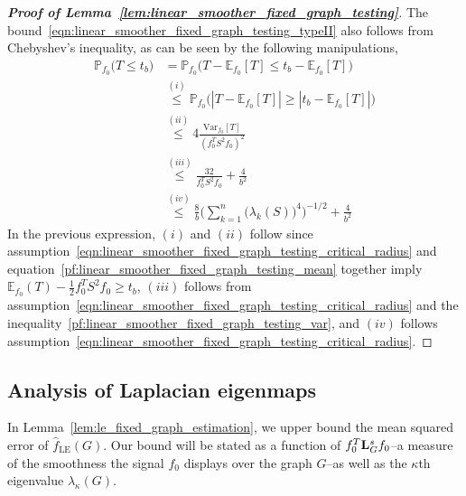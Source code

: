 \documentclass{article}
\newcommand{\abs}[1]{\left \lvert #1 \right \rvert}
\newcommand{\Var}{\mathrm{Var}}
\newcommand{\1}{\mathbf{1}}
\newcommand{\Lap}{{\bf L}}
\newcommand{\Pbb}{\mathbb{P}}
\newcommand{\Ebb}{\mathbb{E}}
\newcommand{\wh}[1]{\widehat{#1}}
\newcommand{\LE}{\mathrm{LE}}
\theoremstyle{alden}
\theoremstyle{aldenthm}
\theoremstyle{definition}
\theoremstyle{remark}
\begin{document}
\begin{proof}[\textbf{Proof of Lemma~\ref{lem:linear_smoother_fixed_graph_testing}}]
	The bound~\eqref{eqn:linear_smoother_fixed_graph_testing_typeII} also follows from Chebyshev's inequality, as can be seen by the following manipulations,
	\begin{equation*}
	\begin{aligned}
	\Pbb_{f_0}\bigl(T \leq t_b\bigr) & = \Pbb_{f_0}\bigl(T - \Ebb_{f_0}[T] \leq t_b - \Ebb_{f_0}[T]\bigr) \\
	& \overset{(i)}{\leq} \Pbb_{f_0}\bigl(\abs{T - \Ebb_{f_0}[T]} \geq \abs{t_b - \Ebb_{f_0}[T]}\bigr) \\ 
	& \overset{(ii)}{\leq} 4 \frac{\Var_{f_0}[T]}{(f_0^T S^2 f_0)^2} \\
	& \overset{(iii)}{\leq} \frac{32}{f_0^T S^2 f_0} + \frac{4}{b^2} \\
	& \overset{(iv)}{\leq} \frac{8}{b} \Biggl(\sum_{k = 1}^{n}\bigl(\lambda_k(S)\bigr)^4\Biggr)^{-1/2} + \frac{4}{b^2}
	\end{aligned}
	\end{equation*}
	In the previous expression, $(i)$ and $(ii)$ follow since assumption~\eqref{eqn:linear_smoother_fixed_graph_testing_critical_radius} and equation~\eqref{pf:linear_smoother_fixed_graph_testing_mean} together imply $\Ebb_{f_0}(T) - \frac{1}{2}f_0^T S^2f_0 \geq t_b$, $(iii)$ follows from assumption~\eqref{eqn:linear_smoother_fixed_graph_testing_critical_radius} and the inequality~\eqref{pf:linear_smoother_fixed_graph_testing_var}, and $(iv)$ follows assumption~\eqref{eqn:linear_smoother_fixed_graph_testing_critical_radius}.
\end{proof}
\subsection{Analysis of Laplacian eigenmaps}

In Lemma~\ref{lem:le_fixed_graph_estimation}, we upper bound the mean squared error of $\wh{f}_{\LE}(G)$. Our bound will be stated as a function of $f_0^T \Lap_G^s f_0$--a measure of the smoothness the signal $f_0$ displays over the graph $G$--as well as the $\kappa$th eigenvalue $\lambda_{\kappa}(G)$.
\end{document}
